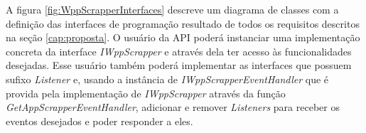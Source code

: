 A figura \ref{fig:WppScrapperInterfaces} descreve um diagrama de classes com a definição das interfaces de programação resultado de todos os requisitos descritos na  seção \ref{cap:proposta}. O usuário da API poderá instanciar uma implementação concreta da interface \textit{IWppScrapper} e através dela ter acesso às funcionalidades desejadas. Esse usuário também poderá implementar as interfaces que possuem sufixo \textit{Listener} e, usando a instância de \textit{IWppScrapperEventHandler} que é provida pela implementação de \textit{IWppScrapper} através da função \textit{GetAppScrapperEventHandler}, adicionar e remover \textit{Listeners} para receber os eventos desejados e poder responder a eles.




